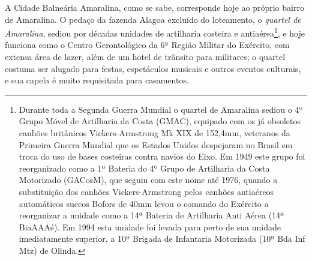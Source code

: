A Cidade Balneária Amaralina, como se sabe, corresponde hoje ao próprio bairro de Amaralina. O pedaço da fazenda Alagoa excluído do loteamento, o \textit{quartel de Amaralina}, sediou por décadas unidades de artilharia costeira e antiaérea\footnote{Durante toda a Segunda Guerra Mundial o quartel de Amaralina sediou o 4º Grupo Móvel de Artilharia da Costa (GMAC), equipado com os já obsoletos canhões britânicos Vickers-Armstrong Mk XIX de 152,4mm, veteranos da Primeira Guerra Mundial que os Estados Unidos despejaram no Brasil em troca do uso de bases costeiras contra navios do Eixo. Em 1949 este grupo foi reorganizado como a 1ª Bateria do 4º Grupo de Artilharia da Costa Motorizado (GACosM), que seguiu com este nome até 1976, quando a substituição dos canhões Vickers-Armstrong pelos canhões antiaéreos automáticos suecos Bofors de 40mm levou o comando do Exército a reorganizar a unidade como a 14ª Bateria de Artilharia Anti Aérea (14ª BiaAAAé). Em 1994 esta unidade foi levada para perto de sua unidade imediatamente superior, a 10ª Brigada de Infantaria Motorizada (10ª Bda Inf Mtz) de Olinda.}, e hoje funciona como o Centro Gerontológico da 6ª Região Militar do Exército, com extensa área de lazer, além de um hotel de trânsito para militares; o quartel costuma ser alugado para festas, espetáculos musicais e outros eventos culturais, e sua capela é muito requisitada para casamentos.

